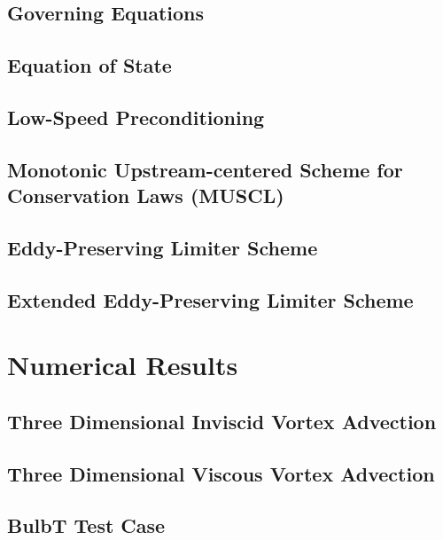 \documentclass[twocolumn,10pt]{asme2ej}
\begin{document}
\subsection{Governing Equations}


\subsection{Equation of State}


\subsection{Low-Speed Preconditioning}


\subsection{Monotonic Upstream-centered Scheme for Conservation Laws (MUSCL)}


\subsection{Eddy-Preserving Limiter Scheme}


\subsection{Extended Eddy-Preserving Limiter Scheme}

\section{Numerical Results} 

\subsection{Three Dimensional Inviscid Vortex Advection}

\subsection{Three Dimensional Viscous Vortex Advection}


\subsection{BulbT Test Case}

\end{document}
